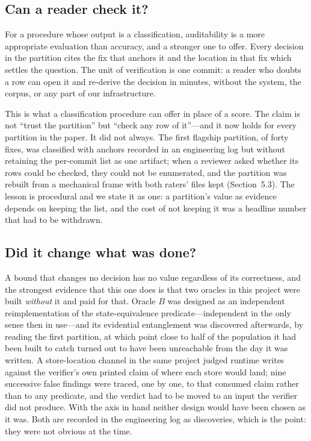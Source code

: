 \subsection{Can a reader check it?}

For a procedure whose output is a classification, auditability is a more appropriate
evaluation than accuracy, and a stronger one to offer. Every decision in the
partition cites the fix that anchors it and the location in that fix which settles
the question. The unit of verification is one commit: a reader who doubts a row can
open it and re-derive the decision in minutes, without the system, the corpus, or
any part of our infrastructure.

This is what a classification procedure can offer in place of a score. The claim is
not ``trust the partition'' but ``check any row of it''---and it now holds for every partition
in the paper. It did not always. The first flagship partition, of forty fixes, was
classified with anchors recorded in an engineering log but without retaining the
per-commit list as one artifact; when a reviewer asked whether its rows could be
checked, they could not be enumerated, and the partition was rebuilt from a
mechanical frame with both raters' files kept (Section~5.3). The lesson is procedural
and we state it as one: a partition's value as evidence depends on keeping the list,
and the cost of not keeping it was a headline number that had to be withdrawn.

\subsection{Did it change what was done?}

A bound that changes no decision has no value regardless of its correctness, and
the strongest evidence that this one does is that two oracles in this project were
built \emph{without} it and paid for that. Oracle $B$ was designed as an independent
reimplementation of the state-equivalence predicate---independent in the only sense
then in use---and its evidential entanglement was discovered afterwards, by reading
the first partition, at which point close to half of the population it had been built
to catch turned out to have been unreachable from the day it was written. A store-location channel in
the same project judged runtime writes against the verifier's own printed claim of
where each store would land; nine successive false findings were traced, one by one,
to that consumed claim rather than to any predicate, and the verdict had to be moved
to an input the verifier did not produce. With the axis in hand neither design would
have been chosen as it was. Both are recorded in the engineering log as discoveries,
which is the point: they were not obvious at the time.

